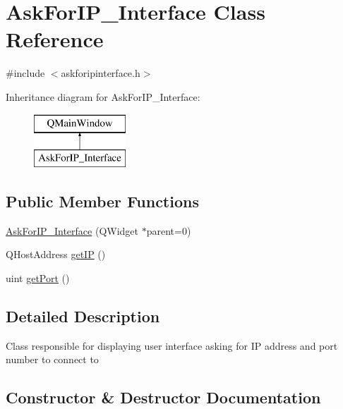 \hypertarget{class_ask_for_i_p___interface}{}\section{Ask\+For\+I\+P\+\_\+\+Interface Class Reference}
\label{class_ask_for_i_p___interface}


{\ttfamily \#include $<$askforipinterface.\+h$>$}

Inheritance diagram for Ask\+For\+I\+P\+\_\+\+Interface\+:\begin{figure}[H]
\begin{center}
\leavevmode
\includegraphics[height=2.000000cm]{class_ask_for_i_p___interface}
\end{center}
\end{figure}
\subsection*{Public Member Functions}
\begin{DoxyCompactItemize}
\item 
\mbox{\hyperlink{class_ask_for_i_p___interface_a76694e9589d8a7a339127e427dd404df}{Ask\+For\+I\+P\+\_\+\+Interface}} (Q\+Widget $\ast$parent=0)
\item 
Q\+Host\+Address \mbox{\hyperlink{class_ask_for_i_p___interface_a825a41d9af858b34f2acdb187ef3c327}{get\+IP}} ()
\item 
uint \mbox{\hyperlink{class_ask_for_i_p___interface_af3d49951f070582d72c125b631f8212d}{get\+Port}} ()
\end{DoxyCompactItemize}


\subsection{Detailed Description}
Class responsible for displaying user interface asking for IP address and port number to connect to 

\subsection{Constructor \& Destructor Documentation}
\mbox{\label{class_ask_for_i_p___interface_a76694e9589d8a7a339127e427dd404df}} 
